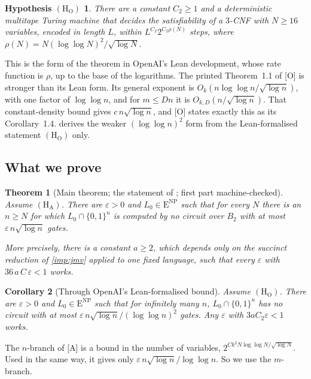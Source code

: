 \documentclass[10pt]{amsart}
\theoremstyle{plain}
\newtheorem{theorem}{Theorem}[section]
\newtheorem{corollary}[theorem]{Corollary}
\newtheorem*{hypO}{Hypothesis $(\mathrm{H}_{\mathrm{O}})$}
\theoremstyle{definition}
\theoremstyle{remark}
\numberwithin{equation}{section}
\newcommand{\ENP}{\mathrm{E}^{\mathrm{NP}}}
\newcommand{\A}{\textup{[A]}}
\newcommand{\Oa}{\textup{[O]}}
\begin{document}
\begin{hypO}
There are a constant $C_2\ge1$ and a deterministic multitape Turing machine that decides the
satisfiability of a $3$-CNF with $N\ge 16$ variables, encoded in length $L$, within
$L^{C_2}2^{C_2\rho(N)}$ steps, where $\rho(N)=N(\log\log N)^2/\sqrt{\log N}$.
\end{hypO}

\noindent This is the form of the theorem  in OpenAI's Lean
development, whose rate function is $\rho$, up to the base of the logarithms. The printed
Theorem~1.1 of \Oa{} is stronger than its Lean form. Its general exponent is
$O_k(n\log\log n/\sqrt{\log n})$, with one factor of $\log\log n$, and for $m\le Dn$ it is
$O_{k,D}(n/\sqrt{\log n})$. That constant-density bound gives $c\,n\sqrt{\log n}$, and \Oa{} states
exactly this as its Corollary~1.4.  derives the weaker $(\log\log n)^2$ form from the
Lean-formalised statement $(\mathrm{H}_{\mathrm{O}})$ only.

\subsection{What we prove}

\begin{theorem}[{Main theorem; the statement of \cite[Corollary~1.4]{OpenAI26}; first part machine-checked}]\label{thm:main}
Assume $(\mathrm{H}_{\mathrm{A}})$. There are $\varepsilon>0$ and $L_0\in\ENP$ such that for every
$N$ there is an $n\ge N$ for which $L_0\cap\{0,1\}^n$ is computed by no circuit over $B_2$ with at
most $\varepsilon\,n\sqrt{\log n}$ gates.

More precisely, there is a constant $a\ge2$, which depends only on the succinct reduction of
\cref{imp:jmv} applied to one fixed language, such that every $\varepsilon$ with
$36\,a\,C\,\varepsilon<1$ works.
\end{theorem}

\begin{corollary}[Through OpenAI's Lean-formalised bound]\label{cor:openai}
Assume $(\mathrm{H}_{\mathrm{O}})$. There are $\varepsilon>0$ and $L_0\in\ENP$ such that for
infinitely many $n$, $L_0\cap\{0,1\}^n$ has no circuit with at most
$\varepsilon\,n\sqrt{\log n}/(\log\log n)^2$ gates. Any $\varepsilon$ with
$3aC_2\varepsilon<1$ works.
\end{corollary}

The $n$-branch of \A{} is a bound in the number of variables, $2^{C k^2N\log\log N/\sqrt{\log N}}$.
Used in the same way, it gives only $\varepsilon\,n\sqrt{\log n}/\log\log n$. So we use the
$m$-branch.
\end{document}
